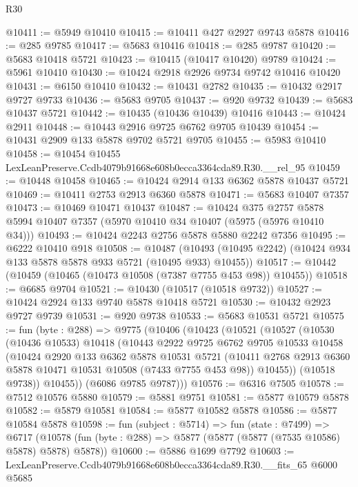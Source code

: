 \begin{lexlean}{R30}
\begin{coremodule}
@10411 := @5949 @10410
@10415 := @10411 @427 @2927 @9743 @5878
@10416 := @285 @9785
@10417 := @5683 @10416
@10418 := @285 @9787
@10420 := @5683 @10418 @5721
@10423 := @10415 (@10417 @10420) @9789
@10424 := @5961 @10410
@10430 := @10424 @2918 @2926 @9734 @9742 @10416 @10420
@10431 := @6150 @10410
@10432 := @10431 @2782
@10435 := @10432 @2917 @9727 @9733
@10436 := @5683 @9705
@10437 := @920 @9732
@10439 := @5683 @10437 @5721
@10442 := @10435 (@10436 @10439) @10416
@10443 := @10424 @2911
@10448 := @10443 @2916 @9725 @6762 @9705 @10439
@10454 := @10431 @2909 @133 @5878 @9702 @5721 @9705
@10455 := @5983 @10410
@10458 := @10454 @10455 LexLeanPreserve.Ccdb4079b91668e608b0ecca3364cda89.R30.__rel_95
@10459 := @10448 @10458
@10465 := @10424 @2914 @133 @6362 @5878 @10437 @5721
@10469 := @10411 @2753 @2913 @6360 @5878
@10471 := @5683 @10407 @7357
@10473 := @10469 @10471 @10437
@10487 := @10424
    @375
    @2757
    @5878
    @5994
    @10407
    @7357
    (@5970 @10410 @34 @10407 (@5975 (@5976 @10410 @34)))
@10493 := @10424 @2243 @2756 @5878 @5880 @2242 @7356
@10495 := @6222 @10410 @918
@10508 := @10487
    (@10493 (@10495 @2242) (@10424 @934 @133 @5878 @5878 @933 @5721 (@10495 @933) @10455))
@10517 := @10442 (@10459 (@10465 (@10473 @10508 (@7387 @7755 @453 @98)) @10455))
@10518 := @6685 @9704
@10521 := @10430 (@10517 (@10518 @9732))
@10527 := @10424 @2924 @133 @9740 @5878 @10418 @5721
@10530 := @10432 @2923 @9727 @9739
@10531 := @920 @9738
@10533 := @5683 @10531 @5721
@10575 := fun (byte : @288) =>
  @9775
    (@10406
      (@10423
        (@10521
          (@10527
            (@10530
              (@10436 @10533)
              @10418
              (@10443
                @2922
                @9725
                @6762
                @9705
                @10533
                @10458
                (@10424
                  @2920
                  @133
                  @6362
                  @5878
                  @10531
                  @5721
                  (@10411 @2768 @2913 @6360 @5878 @10471 @10531 @10508 (@7433 @7755 @453 @98))
                  @10455))
              (@10518 @9738))
            @10455))
        (@6086 @9785 @9787)))
@10576 := @6316 @7505
@10578 := @7512 @10576 @5880
@10579 := @5881 @9751
@10581 := @5877 @10579 @5878
@10582 := @5879 @10581
@10584 := @5877 @10582 @5878
@10586 := @5877 @10584 @5878
@10598 := fun (subject : @5714) =>
  fun (state : @7499) =>
  @6717 (@10578 (fun (byte : @288) => @5877 (@5877 (@5877 (@7535 @10586) @5878) @5878) @5878))
@10600 := @5886 @1699 @7792
@10603 := LexLeanPreserve.Ccdb4079b91668e608b0ecca3364cda89.R30.__fits_65 @6000 @5685

\end{coremodule}
\end{lexlean}
